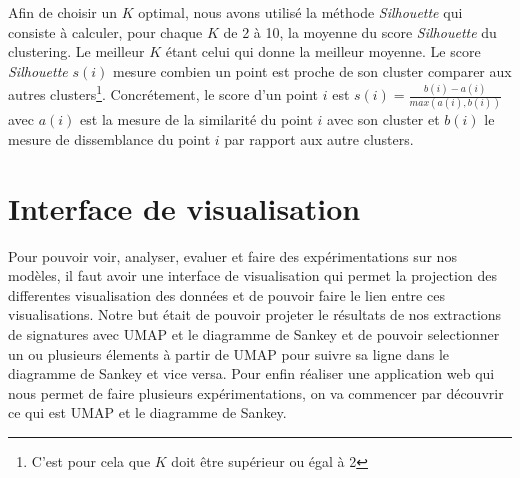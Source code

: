 \documentclass[oneside,13pt,a4paper]{report}
\begin{document}
Afin de choisir un $K$ optimal, nous avons utilisé la méthode \textit{Silhouette} qui consiste à calculer, pour chaque $K$ de 2 à 10, la moyenne du score \textit{Silhouette} du clustering. Le meilleur $K$ étant celui qui donne la meilleur moyenne. Le score \textit{Silhouette} $ s(i) $ mesure combien un point est proche de son cluster comparer aux autres clusters\footnote{C'est pour cela que $ K $ doit être supérieur ou égal à 2}. Concrétement, le score d'un point $i$ est $ s(i) = \frac{b(i) - a(i)}{max(a(i), b(i))} $ avec $a(i)$ est la mesure de la similarité du point $i$ avec son cluster et $b(i)$ le mesure de dissemblance du point $i$ par rapport aux autre clusters.

\section{Interface de visualisation}
Pour pouvoir voir, analyser, evaluer et faire des expérimentations sur nos modèles, il faut avoir une interface de visualisation qui permet la projection des differentes visualisation des données et de pouvoir faire le lien entre ces visualisations.
Notre but était de pouvoir projeter le résultats de nos extractions de signatures avec UMAP et le diagramme de Sankey et de pouvoir selectionner un ou plusieurs élements à partir de UMAP pour suivre sa ligne dans le diagramme de Sankey et vice versa.
Pour enfin réaliser une application web qui nous permet de faire plusieurs expérimentations, on va commencer par découvrir ce qui est UMAP et le diagramme de Sankey.
\end{document}
